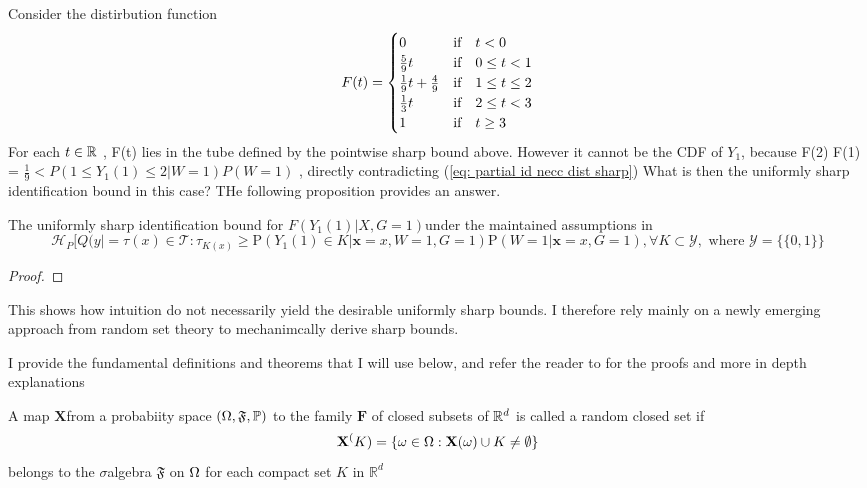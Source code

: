 \documentclass{article}
\begin{document}
Consider the distirbution function 
\begin{align}
    F(t) = \begin{cases}
        0&\text{if}\quad t < 0\\
        \frac{5}{9}t & \text{if}\quad 0 \leq t < 1 \\
        \frac{1}{9}t + \frac{4}{9} & \text{if}\quad  1 \leq t \leq 2\\
        \frac{1}{3}t & \text{if}\quad  2\leq t < 3\\
        1 & \text{if}\quad t \geq 3
    \end{cases}
\end{align}
For each $t \in\mathbb{R}$ , F(t)  lies in the tube defined by the pointwise sharp bound above. However it cannot be the CDF of $ Y_1$, because F(2)  F(1) = $ \frac{1}{9}< P (1 \leq Y_1(1) \leq 2 | W=1) P( W=1)  $ , directly contradicting (\ref{eq: partial id necc dist sharp})
What is then the uniformly sharp identification bound in this case? THe following proposition provides an answer.
\begin{proposition}
    The uniformly sharp identification bound for $ F(Y_1(1) |  X, G=1)$under the maintained assumptions in \cite{athey2020combining} 
    \begin{equation}
        \mathcal{H}_P[ Q(y |   =  \tau(x) \in \mathcal{T} : \tau_{K(x) }\geq \mathrm{P}( Y_1(1) \in K | \mathbf{x}=x, W=1,G=1) \mathrm{P}(W =1 | \mathbf{x} = x, G=1) , \forall K \subset \mathcal{Y} , \text{ where }\mathcal{Y}= \{ \{0,1\} \}
    \end{equation} 
\end{proposition}
\begin{proof}
    
\end{proof}


This shows how intuition do not necessarily yield the desirable uniformly sharp bounds. I therefore rely mainly on a newly emerging approach from random set theory\cite{molchanov2005theory} to mechanimcally derive sharp bounds. 


I provide the fundamental definitions and theorems that I will use below, and refer the reader to \cite{molchanov2005theory,molchanov2018random} for the proofs and more in depth explanations
\begin{definition}
    A map $\mathbf{X} $from a probabiity space $( \Omega,\mathfrak{F},\mathbb{P} ) $ to the family $\mathbf{F} $ of closed subsets of $ \mathbb{R}^d $ is called a random closed set if 
    \begin{equation}
        \mathbf{ X}^(K) = \{ \omega \in \Omega : \mathbf{X} (\omega) \cup K \neq \emptyset \}     
    \end{equation}
    belongs to the $\sigma $algebra $\mathfrak{F} $ on $\Omega$ for each compact set $K$ in $\mathbb{R}^d$
\end{definition}
\end{document}

